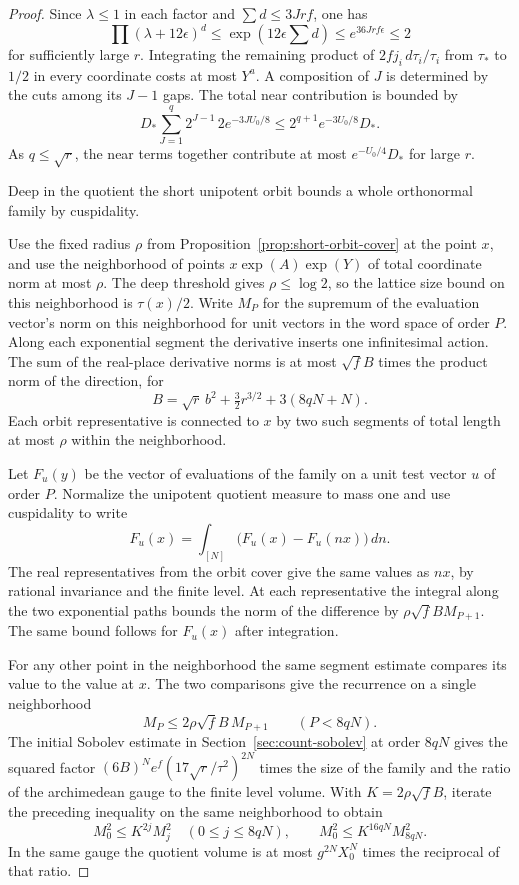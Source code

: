 \begin{proof}
Since \(\lambda\le1\) in each factor and \(\sum d\le3Jrf\), one has
\[
       \prod (\lambda+12\epsilon)^d
            \le\exp(12\epsilon\textstyle\sum d)
            \le e^{36Jrf\epsilon}\le2
\]
for sufficiently large \(r\).
  Integrating the remaining product of \(2fj_i\,d\tau_i/\tau_i\)
  from \(\tau_*\) to \(1/2\) in every coordinate costs at most
  \(Y^a\).
  A composition of \(J\) is determined by the cuts among its
\(J-1\) gaps. The total near contribution is bounded by
\[
  D_*\sum_{J=1}^q2^{J-1}\,2e^{-3JU_0/8}
      \le 2^{q+1}e^{-3U_0/8}D_* .
\] As \(q\le\sqrt r\), the near
  terms together contribute at most \(e^{-U_0/4}D_*\) for
  large \(r\).

Deep in the quotient the short unipotent orbit bounds a whole orthonormal family by cuspidality.

  Use the fixed radius \(\rho\) from Proposition~\ref{prop:short-orbit-cover}
  at the point \(x\), and use the neighborhood of points
  \(x\exp(A)\exp(Y)\) of total coordinate norm at most \(\rho\).
  The deep threshold gives \(\rho\le\log2\), so the lattice
  size bound on this neighborhood is \(\tau(x)/2\).
  Write \(M_P\) for the supremum of the evaluation vector's
  norm on this neighborhood for unit vectors in the word
  space of order \(P\). Along each exponential segment the
  derivative inserts one infinitesimal action. The sum of
  the real-place derivative norms is at most \(\sqrt f B\)
  times the product norm of the direction, for
  \[
    B=\sqrt r\,b^2+\tfrac32 r^{3/2}+3(8qN+N).
  \]
  Each orbit representative is connected to \(x\) by two such
  segments of total length at most \(\rho\) within the
  neighborhood.

Let \(F_u(y)\) be the vector of evaluations of the family
  on a unit test vector \(u\) of order \(P\).
  Normalize the unipotent quotient measure to mass one and use
  cuspidality to write
  \[
    F_u(x)=\int_{[N]}\bigl(F_u(x)-F_u(nx)\bigr)\,dn .
  \]
  The real representatives from the orbit cover give the
  same values as \(nx\), by rational invariance and the finite
  level. At each representative the integral along the two
  exponential paths bounds the norm of the difference by
  \(\rho\sqrt f B M_{P+1}\). The same bound follows for
  \(F_u(x)\) after integration.

For any other point in the neighborhood the same segment
  estimate compares its value to the value at \(x\). The two comparisons give the recurrence on a single neighborhood
\[
             M_P\le2\rho\sqrt f B\,M_{P+1}\qquad(P<8qN).
\]
  The initial Sobolev estimate in Section~\ref{sec:count-sobolev}
  at order \(8qN\) gives the
  squared factor \((6B)^N e^f(17\sqrt r/\tau^2)^{2N}\)
  times the size of the family and the ratio of the archimedean gauge to the
  finite level volume. With \(K=2\rho\sqrt f B\), iterate the preceding inequality
on the same neighborhood to obtain
\[
 M_0^2\le K^{2j}M_j^2 \quad(0\le j\le8qN),\qquad
 M_0^2\le K^{16qN}M_{8qN}^2 .
\]
  In the same gauge the quotient volume is at most
  \(g^{2N}X_0^N\) times the reciprocal of that ratio.


\end{proof}
